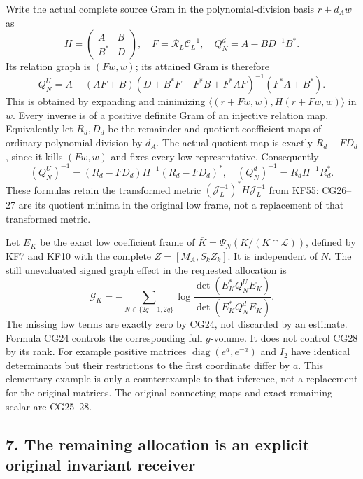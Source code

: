 Write the actual complete source Gram in the polynomial-division basis \(r+d_Aw\) as \[
H=\begin{pmatrix}A&B\\B^*&D\end{pmatrix},\quad
F=\mathcal R_L\mathcal C_L^{-1},\quad
Q_N^d=A-BD^{-1}B^*.
\tag{CG25}
\] Its relation graph is \((Fw,w)\); its attained Gram is therefore \[
Q_N^U=A-(AF+B)
(D+B^*F+F^*B+F^*AF)^{-1}(F^*A+B^*).
\tag{CG26}
\] This is obtained by expanding and minimizing \(\langle(r+Fw,w),H(r+Fw,w)\rangle\) in \(w\). Every inverse is of a positive definite Gram of an injective relation map. Equivalently let \(R_d,D_d\) be the remainder and quotient-coefficient maps of ordinary polynomial division by \(d_A\). The actual quotient map is exactly \(R_d-FD_d\), since it kills \((Fw,w)\) and fixes every low representative. Consequently \[
(Q_N^U)^{-1}=(R_d-FD_d)H^{-1}(R_d-FD_d)^*,
\quad (Q_N^d)^{-1}=R_dH^{-1}R_d^*.
\tag{CG27}
\] These formulas retain the transformed metric \((\mathcal J_L^{-1})^*H\mathcal J_L^{-1}\) from KF55: CG26--27 are its quotient minima in the original low frame, not a replacement of that transformed metric.

Let \(E_K\) be the exact low coefficient frame of \(\overline K=\Psi_N(K/(K\cap\mathcal L))\), defined by KF7 and KF10 with the complete \(Z=[M_A,S_kZ_k]\). It is independent of \(N\). The still unevaluated signed graph effect in the requested allocation is \[
\mathcal G_K=
-\sum_{N\in\{2q-1,2q\}}
\log\frac{\det(E_K^*Q_N^UE_K)}{\det(E_K^*Q_N^dE_K)}.
\tag{CG28}
\] The missing low terms are exactly zero by CG24, not discarded by an estimate. Formula CG24 controls the corresponding full \(g\)-volume. It does not control CG28 by its rank. For example positive matrices \(\operatorname{diag}(e^a,e^{-a})\) and \(I_2\) have identical determinants but their restrictions to the first coordinate differ by \(a\). This elementary example is only a counterexample to that inference, not a replacement for the original matrices. The original connecting maps and exact remaining scalar are CG25--28.

\subsection{7. The remaining allocation is an explicit original invariant receiver}\label{the-remaining-allocation-is-an-explicit-original-invariant-receiver}

